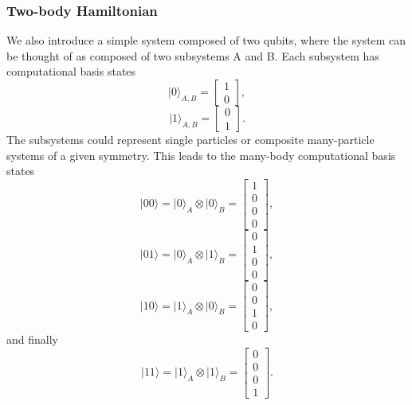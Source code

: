 \documentclass[onecolumn,10pt,cleanfoot]{asme2ej}
\begin{document}
\subsubsection{Two-body Hamiltonian}
We also introduce a simple system composed of two qubits, where the system can be thought of as composed of two subsystems A and B.
Each subsystem has computational basis states
\begin{equation}
|0\rangle_{A,B} = \begin{bmatrix} 1 \\ 0 \end{bmatrix},
\end{equation}
\begin{equation}
|1\rangle_{A,B} = \begin{bmatrix} 0 \\ 1 \end{bmatrix}.
\end{equation}
The subsystems could represent single particles or composite many-particle
systems of a given symmetry. This leads to the many-body computational basis
states
\begin{equation}
|00\rangle = |0\rangle_A \otimes |0\rangle_B = \begin{bmatrix} 1 \\ 0 \\ 0 \\ 0 \end{bmatrix},
\end{equation}
\begin{equation}
|01\rangle = |0\rangle_A \otimes |1\rangle_B = \begin{bmatrix} 0 \\ 1 \\ 0 \\ 0 \end{bmatrix},
\end{equation}
\begin{equation}
|10\rangle = |1\rangle_A \otimes |0\rangle_B = \begin{bmatrix} 0 \\ 0 \\ 1 \\ 0 \end{bmatrix},
\end{equation}
and finally
\begin{equation}
|11\rangle = |1\rangle_A \otimes |1\rangle_B = \begin{bmatrix} 0 \\ 0 \\ 0 \\ 1 \end{bmatrix}.
\end{equation}
\end{document}

